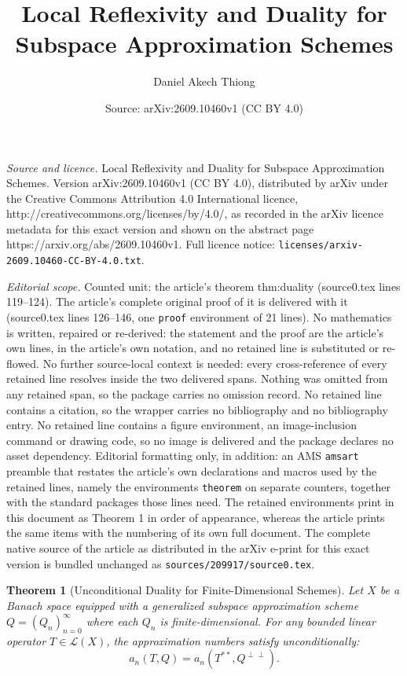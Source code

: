 \documentclass[10pt,a4paper]{amsart}
\title{Local Reflexivity and Duality for Subspace Approximation Schemes}
\author{Daniel Akech Thiong}
\date{Source: arXiv:2609.10460v1 (CC BY 4.0)}
\newtheorem{theorem}{Theorem}
\begin{document}
\maketitle

\noindent\emph{Source and licence.} Local Reflexivity and Duality for Subspace Approximation Schemes. Version arXiv:2609.10460v1 (CC BY 4.0), distributed by arXiv under the Creative Commons Attribution 4.0 International licence, http://creativecommons.org/licenses/by/4.0/, as recorded in the arXiv licence metadata for this exact version and shown on the abstract page https://arxiv.org/abs/2609.10460v1. Full licence notice: \texttt{licenses/arxiv-2609.10460-CC-BY-4.0.txt}.\par\smallskip

\noindent\textit{Editorial scope.} Counted unit: the article's theorem thm:duality (source0.tex lines 119--124). The article's complete original proof of it is delivered with it (source0.tex lines 126--146, one \texttt{proof} environment of 21 lines). No mathematics is written, repaired or re-derived: the statement and the proof are the article's own lines, in the article's own notation, and no retained line is substituted or re-flowed.  No further source-local context is needed: every cross-reference of every retained line resolves inside the two delivered spans.  Nothing was omitted from any retained span, so the package carries no omission record.  No retained line contains a citation, so the wrapper carries no bibliography and no bibliography entry.  No retained line contains a figure environment, an image-inclusion command or drawing code, so no image is delivered and the package declares no asset dependency.  Editorial formatting only, in addition: an AMS \texttt{amsart} preamble that restates the article's own declarations and macros used by the retained lines, namely the environments \texttt{theorem} on separate counters, together with the standard packages those lines need.  The retained environments print in this document as Theorem 1 in order of appearance, whereas the article prints the same items with the numbering of its own full document.  The complete native source of the article as distributed in the arXiv e-print for this exact version is bundled unchanged as \texttt{sources/209917/source0.tex}.
\begin{theorem}[Unconditional Duality for Finite-Dimensional Schemes] \label{thm:duality}
Let $X$ be a Banach space equipped with a generalized subspace approximation scheme $Q = (Q_n)_{n=0}^\infty$ where each $Q_n$ is finite-dimensional. For any bounded linear operator $T \in \mathcal{L}(X)$, the approximation numbers satisfy unconditionally:
\begin{equation}
a_n(T, Q) = a_n(T^{**}, Q^{\perp\perp}).
\end{equation}
\end{theorem}
\end{document}
